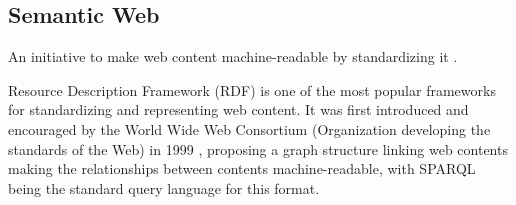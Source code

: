 \subsection{Semantic Web}

An initiative to make web content machine-readable by standardizing it \cite{pellegrini2006semantic}.

Resource Description Framework (RDF) is one of the most popular frameworks for standardizing and representing web content. It was first introduced and encouraged by the World Wide Web Consortium (Organization developing the standards of the Web) in 1999 \cite{dataeuropa_rdf_sparql}, proposing a graph structure linking web contents making the relationships between contents machine-readable, with SPARQL being the standard query language for this format.



